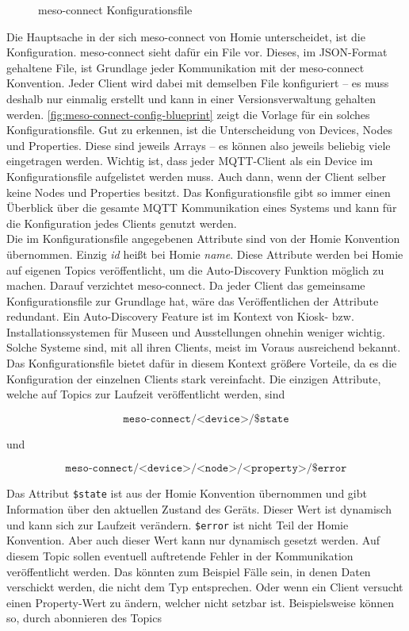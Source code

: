 \begin{figure}
  
  \caption{meso-connect Konfigurationsfile}
  \label{fig:meso-connect-config-blueprint}
\end{figure}

Die Hauptsache in der sich meso-connect von Homie unterscheidet, ist die Konfiguration. meso-connect
sieht dafür ein File vor. Dieses, im JSON-Format gehaltene File, ist Grundlage jeder Kommunikation
mit der meso-connect Konvention. Jeder Client wird dabei mit demselben File konfiguriert -- es muss 
deshalb nur einmalig erstellt und kann in einer Versionsverwaltung gehalten werden. 
\autoref{fig:meso-connect-config-blueprint} zeigt die Vorlage für ein solches Konfigurationsfile. 
Gut zu erkennen, ist die Unterscheidung von Devices, Nodes und Properties. Diese sind jeweils Arrays --
es können also jeweils beliebig viele eingetragen werden. Wichtig ist, dass jeder MQTT-Client als ein
Device im Konfigurationsfile aufgelistet werden muss. Auch dann, wenn der Client selber 
keine Nodes und Properties besitzt. Das Konfigurationsfile gibt so immer einen Überblick über die 
gesamte MQTT Kommunikation eines Systems und kann für die Konfiguration jedes Clients genutzt werden.\\
Die im Konfigurationsfile angegebenen Attribute sind von der Homie Konvention übernommen. Einzig \emph{id} heißt
bei Homie \emph{name}. Diese Attribute werden bei Homie auf eigenen Topics veröffentlicht, um die 
Auto-Discovery Funktion möglich zu machen. Darauf verzichtet meso-connect. Da jeder Client das gemeinsame
Konfigurationsfile zur Grundlage hat, wäre das Veröffentlichen der Attribute redundant. Ein Auto-Discovery
Feature ist im Kontext von Kiosk- bzw. Installationssystemen für Museen und Ausstellungen ohnehin weniger wichtig.
Solche Systeme sind, mit all ihren Clients, meist im Voraus ausreichend bekannt. Das Konfigurationsfile
bietet dafür in diesem Kontext größere Vorteile, da es die Konfiguration der einzelnen Clients stark
vereinfacht. Die einzigen Attribute, welche auf Topics zur Laufzeit veröffentlicht 
werden, sind

\[\texttt{meso-connect/<device>/\$state} \]

und

\[\texttt{meso-connect/<device>/<node>/<property>/\$error} \]

Das Attribut \texttt{\$state} ist aus der Homie Konvention übernommen und gibt Information über den aktuellen
Zustand des Geräts. Dieser Wert ist dynamisch und kann sich zur Laufzeit verändern. \texttt{\$error} ist nicht 
Teil der Homie Konvention. Aber auch dieser Wert kann nur dynamisch gesetzt werden.
Auf diesem Topic sollen eventuell auftretende Fehler in der Kommunikation veröffentlicht
werden. Das könnten zum Beispiel Fälle sein, in denen Daten verschickt werden, die nicht dem Typ entsprechen.
Oder wenn ein Client versucht einen Property-Wert zu ändern, welcher nicht setzbar ist. Beispielsweise können so,
durch abonnieren des Topics

